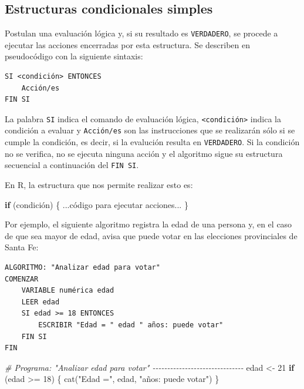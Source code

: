 \documentclass[
]{book}
\newenvironment{Shaded}{\begin{snugshade}}{\end{snugshade}}
\newcommand{\CommentTok}[1]{\textcolor[rgb]{0.56,0.35,0.01}{\textit{#1}}}
\newcommand{\ControlFlowTok}[1]{\textcolor[rgb]{0.13,0.29,0.53}{\textbf{#1}}}
\newcommand{\DecValTok}[1]{\textcolor[rgb]{0.00,0.00,0.81}{#1}}
\newcommand{\FunctionTok}[1]{\textcolor[rgb]{0.00,0.00,0.00}{#1}}
\newcommand{\NormalTok}[1]{#1}
\newcommand{\OtherTok}[1]{\textcolor[rgb]{0.56,0.35,0.01}{#1}}
\newcommand{\SpecialCharTok}[1]{\textcolor[rgb]{0.00,0.00,0.00}{#1}}
\newcommand{\StringTok}[1]{\textcolor[rgb]{0.31,0.60,0.02}{#1}}
\begin{document}
\hypertarget{estructuras-condicionales-simples}{%
\subsection{Estructuras condicionales simples}\label{estructuras-condicionales-simples}}

Postulan una evaluación lógica y, si su resultado es \texttt{VERDADERO}, se procede a ejecutar las acciones encerradas por esta estructura. Se describen en pseudocódigo con la siguiente sintaxis:

\begin{verbatim}
SI <condición> ENTONCES
    Acción/es
FIN SI
\end{verbatim}

La palabra \texttt{SI} indica el comando de evaluación lógica, \texttt{\textless{}condición\textgreater{}} indica la condición a evaluar y \texttt{Acción/es} son las instrucciones que se realizarán sólo si se cumple la condición, es decir, si la evalución resulta en \texttt{VERDADERO}. Si la condición no se verifica, no se ejecuta ninguna acción y el algoritmo sigue su estructura secuencial a continuación del \texttt{FIN\ SI}.

En R, la estructura que nos permite realizar esto es:

\begin{Shaded}
\begin{Highlighting}[]
\ControlFlowTok{if}\NormalTok{ (condición) \{}
\NormalTok{    ...código para ejecutar acciones...}
\NormalTok{\}}
\end{Highlighting}
\end{Shaded}

Por ejemplo, el siguiente algoritmo registra la edad de una persona y, en el caso de que sea mayor de edad, avisa que puede votar en las elecciones provinciales de Santa Fe:

\begin{verbatim}
ALGORITMO: "Analizar edad para votar"
COMENZAR
    VARIABLE numérica edad
    LEER edad
    SI edad >= 18 ENTONCES
        ESCRIBIR "Edad = " edad " años: puede votar"
    FIN SI
FIN
\end{verbatim}

\begin{Shaded}
\begin{Highlighting}[]
\CommentTok{\# Programa: "Analizar edad para votar" {-}{-}{-}{-}{-}{-}{-}{-}{-}{-}{-}{-}{-}{-}{-}{-}{-}{-}{-}{-}{-}{-}{-}{-}{-}{-}{-}{-}{-}{-}{-}}
\NormalTok{edad }\OtherTok{\textless{}{-}} \DecValTok{21}
\ControlFlowTok{if}\NormalTok{ (edad }\SpecialCharTok{\textgreater{}=} \DecValTok{18}\NormalTok{) \{}
    \FunctionTok{cat}\NormalTok{(}\StringTok{"Edad ="}\NormalTok{, edad, }\StringTok{"años: puede votar"}\NormalTok{)}
\NormalTok{\}}
\end{Highlighting}
\end{Shaded}
\end{document}
